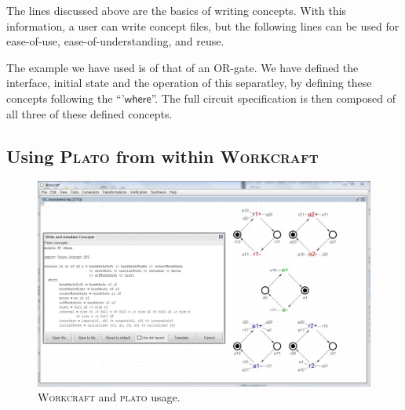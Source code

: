 \documentclass[british,conference,compsoc]{IEEEtran}
\newcommand{\noun}[1]{\textsc{#1}}
\begin{document}
\vspace{-1mm}

The lines discussed above are the basics of writing concepts. With this 
information, a user can write concept files, but the following lines can be 
used for ease-of-use, ease-of-understanding, and reuse. 

The example we have used is of that of an OR-gate. We have defined the 
interface, initial state and the operation of this separatley, by defining 
these concepts following the ``'$\mathsf{where}$''. The full circuit 
specification is then composed of all three of these defined concepts. 

\subsection{Using \noun{Plato} from within \noun{Workcraft} \label{sec:workcraft_usage}}

\vspace{-2mm}

\begin{figure}[H]
\begin{centering}
\vspace{-3mm}
\includegraphics[scale=0.25]{Images/workcraft_design_flow.JPG}
\par\end{centering}

\begin{centering}
\protect\caption{\label{fig:design_flow_screenshot}\noun{Workcraft} and 
			\noun{plato} usage.}

\par\end{centering}
\vspace{-3mm}
\end{figure}
\end{document}
